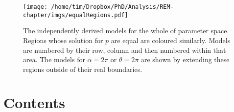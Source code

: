 

\begin{figure}[t]
\centering
\texttt{[image: /home/tim/Dropbox/PhD/Analysis/REM-chapter/imgs/equalRegions.pdf]}
\caption[REM Model numbers]{The independently derived models for the whole of parameter space. Regions whose solution for $p$ are equal are coloured similarly. Models are numbered by their row, column and then numbered within that area. The models for $\alpha = 2\pi$ or $\theta =  2\pi$ are shown by extending these regions outside of their real boundaries.}
\label{f:equalRegions}
\end{figure}


\section{Contents}
